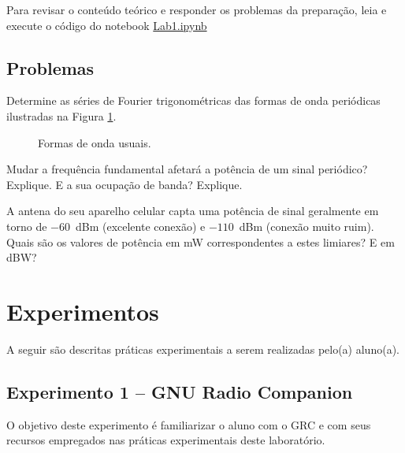 \documentclass[12pt,addpoints]{exam}
\begin{document}
Para revisar o conteúdo teórico e responder os problemas da preparação, leia e execute o código do notebook \href{https://github.com/edsonportosilva/LPC/blob/master/Jupyter/Lab1/Lab1.ipynb}{Lab1.ipynb}

\subsection{Problemas}

\begin{questions}
    \question Determine as séries de Fourier trigonométricas das formas de onda periódicas ilustradas na Figura \ref{fig:sinaisusuais}.
    \begin{figure}[htb]
        \centering
        \label{subfig:ondaquadrada}
        \qquad
        \qquad
        \caption{Formas de onda usuais.}
        \label{fig:sinaisusuais}
    \end{figure}

	\question Mudar a frequência fundamental afetará a potência de um sinal periódico? Explique. E a sua ocupação de banda? Explique.

    \question A antena do seu aparelho celular capta uma potência de sinal geralmente em torno de $-60$~dBm (excelente conexão) e $-110$~dBm (conexão muito ruim). Quais são os valores de potência em mW correspondentes a estes limiares? E em dBW?
  \end{questions}


\section{Experimentos}

A seguir são descritas práticas experimentais a serem realizadas pelo(a) aluno(a).

\subsection{Experimento 1 -- GNU Radio Companion}

O objetivo deste experimento é familiarizar o aluno com o GRC e com seus recursos empregados nas práticas experimentais deste laboratório.
\end{document}
